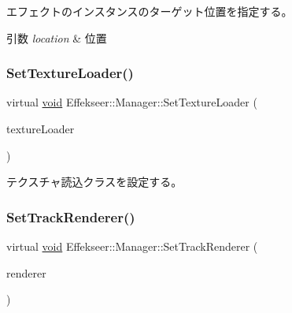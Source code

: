 エフェクトのインスタンスのターゲット位置を指定する。 


\begin{DoxyParams}{引数}
{\em location} & 位置 \\
\hline
\end{DoxyParams}
\mbox{\label{class_effekseer_1_1_manager_a35915c6406f06e7502abed5eeba6ee51}} 
\subsubsection{\texorpdfstring{Set\+Texture\+Loader()}{SetTextureLoader()}}
{\footnotesize\ttfamily virtual \mbox{\hyperlink{namespace_effekseer_ab34c4088e512200cf4c2716f168deb56}{void}} Effekseer\+::\+Manager\+::\+Set\+Texture\+Loader (\begin{DoxyParamCaption}\item[{\mbox{\hyperlink{class_effekseer_1_1_texture_loader}{Texture\+Loader}} $\ast$}]{texture\+Loader }\end{DoxyParamCaption})\hspace{0.3cm}{\ttfamily [pure virtual]}}



テクスチャ読込クラスを設定する。 

\mbox{\label{class_effekseer_1_1_manager_a7bff3a7ec23d6ae4a66b6f6ba4bd58fc}} 
\subsubsection{\texorpdfstring{Set\+Track\+Renderer()}{SetTrackRenderer()}}
{\footnotesize\ttfamily virtual \mbox{\hyperlink{namespace_effekseer_ab34c4088e512200cf4c2716f168deb56}{void}} Effekseer\+::\+Manager\+::\+Set\+Track\+Renderer (\begin{DoxyParamCaption}\item[{\mbox{\hyperlink{class_effekseer_1_1_track_renderer}{Track\+Renderer}} $\ast$}]{renderer }\end{DoxyParamCaption})\hspace{0.3cm}{\ttfamily [pure virtual]}}



